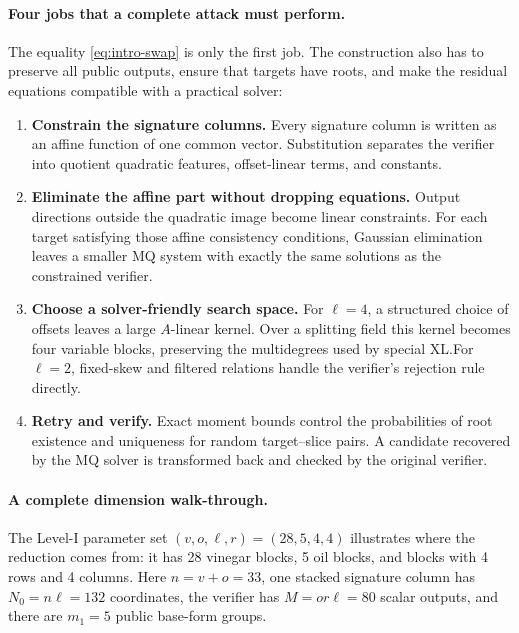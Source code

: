 \documentclass[11pt]{article}
\begin{document}
\paragraph{Four jobs that a complete attack must perform.}
The equality \eqref{eq:intro-swap} is only the first job.  The construction
also has to preserve all public outputs, ensure that targets have roots, and
make the residual equations compatible with a practical solver:
\begin{enumerate}[label=\textbf{\arabic*.},itemsep=3pt]
\item \textbf{Constrain the signature columns.}  Every signature column is
      written as an affine function of one common vector.  Substitution
      separates the verifier into quotient quadratic features, offset-linear
      terms, and constants.
\item \textbf{Eliminate the affine part without dropping equations.}  Output
      directions outside the quadratic image become linear constraints.  For
      each target satisfying those affine consistency conditions, Gaussian
      elimination leaves a smaller MQ system with exactly the same solutions
      as the constrained verifier.
\item \textbf{Choose a solver-friendly search space.}  For $\ell=4$, a
      structured choice of offsets leaves a large $A$-linear kernel.  Over a
      splitting field this kernel becomes four variable blocks, preserving the
      multidegrees used by special XL.\@  For $\ell=2$, fixed-skew and filtered
      relations handle the verifier's rejection rule directly.
\item \textbf{Retry and verify.}  Exact moment bounds control the
      probabilities of root existence and uniqueness for random target--slice
      pairs.  A candidate recovered by the MQ solver is transformed back and
      checked by the original verifier.
\end{enumerate}

\paragraph{A complete dimension walk-through.}
The Level-I parameter set $(v,o,\ell,r)=(28,5,4,4)$ illustrates where the
reduction comes from: it has 28 vinegar blocks, 5 oil blocks, and blocks with
4 rows and 4 columns.  Here $n=v+o=33$, one stacked signature column has
$N_0=n\ell=132$ coordinates, the verifier has $M=or\ell=80$ scalar outputs,
and there are $m_1=5$ public base-form groups.
\end{document}

